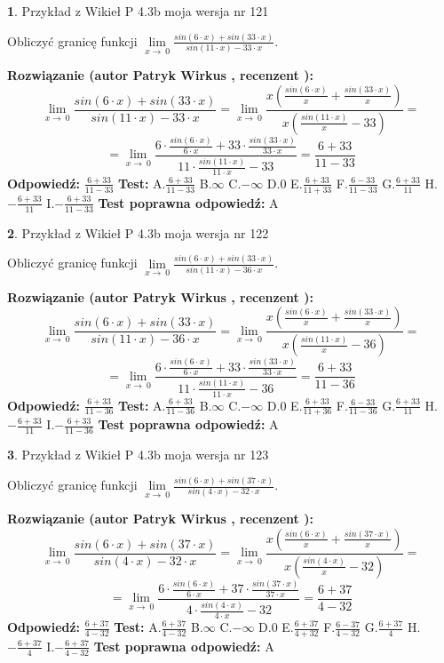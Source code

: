 \documentclass[12pt, a4paper]{article}
\theoremstyle{definition} %
\newtheorem{zad}{}
\newcommand{\zadStart}[1]{\begin{zad}#1\newline}
\newcommand{\zadStop}{\end{zad}}
\newcommand{\rozwStart}[2]{\noindent \textbf{Rozwiązanie (autor #1 , recenzent #2): }\newline}
\newcommand{\rozwStop}{\newline}
\newcommand{\odpStart}{\noindent \textbf{Odpowiedź:}\newline}
\newcommand{\odpStop}{\newline}
\newcommand{\testStart}{\noindent \textbf{Test:}\newline}
\newcommand{\testStop}{\newline}
\newcommand{\kluczStart}{\noindent \textbf{Test poprawna odpowiedź:}\newline}
\newcommand{\kluczStop}{\newline}
\begin{document}
\zadStart{Przykład z Wikieł P 4.3b moja wersja nr 121}


Obliczyć granicę funkcji $\lim\limits_{x\to\ 0}\frac{sin(6 \cdot x)+sin(33 \cdot x)}{sin(11 \cdot x)-33 \cdot x}$.
\zadStop
\rozwStart{Patryk Wirkus}{}
$$\lim\limits_{x\to\ 0}\frac{sin(6 \cdot x)+sin(33 \cdot x)}{sin(11 \cdot x)-33 \cdot x}=\lim\limits_{x\to\ 0}\frac{x(\frac{sin(6 \cdot x)}{x}+\frac{sin(33 \cdot x)}{x})}{x(\frac{sin(11 \cdot x)}{x}-33)}=$$
$$=\lim\limits_{x\to\ 0}\frac{6 \cdot \frac{sin(6 \cdot x)}{6 \cdot x}+33 \cdot \frac{sin(33 \cdot x)}{33 \cdot x}}{11 \cdot \frac{sin(11 \cdot x)}{11 \cdot x}-33}=\frac{6+33}{11-33}$$
\rozwStop
\odpStart
$\frac{6+33}{11-33}$
\odpStop
\testStart
A.$\frac{6+33}{11-33}$
B.$\infty$
C.$-\infty$
D.$0$
E.$\frac{6+33}{11+33}$
F.$\frac{6-33}{11-33}$
G.$\frac{6+33}{11}$
H.$-\frac{6+33}{11}$
I.$-\frac{6+33}{11-33}$
\testStop
\kluczStart
A
\kluczStop



\zadStart{Przykład z Wikieł P 4.3b moja wersja nr 122}


Obliczyć granicę funkcji $\lim\limits_{x\to\ 0}\frac{sin(6 \cdot x)+sin(33 \cdot x)}{sin(11 \cdot x)-36 \cdot x}$.
\zadStop
\rozwStart{Patryk Wirkus}{}
$$\lim\limits_{x\to\ 0}\frac{sin(6 \cdot x)+sin(33 \cdot x)}{sin(11 \cdot x)-36 \cdot x}=\lim\limits_{x\to\ 0}\frac{x(\frac{sin(6 \cdot x)}{x}+\frac{sin(33 \cdot x)}{x})}{x(\frac{sin(11 \cdot x)}{x}-36)}=$$
$$=\lim\limits_{x\to\ 0}\frac{6 \cdot \frac{sin(6 \cdot x)}{6 \cdot x}+33 \cdot \frac{sin(33 \cdot x)}{33 \cdot x}}{11 \cdot \frac{sin(11 \cdot x)}{11 \cdot x}-36}=\frac{6+33}{11-36}$$
\rozwStop
\odpStart
$\frac{6+33}{11-36}$
\odpStop
\testStart
A.$\frac{6+33}{11-36}$
B.$\infty$
C.$-\infty$
D.$0$
E.$\frac{6+33}{11+36}$
F.$\frac{6-33}{11-36}$
G.$\frac{6+33}{11}$
H.$-\frac{6+33}{11}$
I.$-\frac{6+33}{11-36}$
\testStop
\kluczStart
A
\kluczStop



\zadStart{Przykład z Wikieł P 4.3b moja wersja nr 123}


Obliczyć granicę funkcji $\lim\limits_{x\to\ 0}\frac{sin(6 \cdot x)+sin(37 \cdot x)}{sin(4 \cdot x)-32 \cdot x}$.
\zadStop
\rozwStart{Patryk Wirkus}{}
$$\lim\limits_{x\to\ 0}\frac{sin(6 \cdot x)+sin(37 \cdot x)}{sin(4 \cdot x)-32 \cdot x}=\lim\limits_{x\to\ 0}\frac{x(\frac{sin(6 \cdot x)}{x}+\frac{sin(37 \cdot x)}{x})}{x(\frac{sin(4 \cdot x)}{x}-32)}=$$
$$=\lim\limits_{x\to\ 0}\frac{6 \cdot \frac{sin(6 \cdot x)}{6 \cdot x}+37 \cdot \frac{sin(37 \cdot x)}{37 \cdot x}}{4 \cdot \frac{sin(4 \cdot x)}{4 \cdot x}-32}=\frac{6+37}{4-32}$$
\rozwStop
\odpStart
$\frac{6+37}{4-32}$
\odpStop
\testStart
A.$\frac{6+37}{4-32}$
B.$\infty$
C.$-\infty$
D.$0$
E.$\frac{6+37}{4+32}$
F.$\frac{6-37}{4-32}$
G.$\frac{6+37}{4}$
H.$-\frac{6+37}{4}$
I.$-\frac{6+37}{4-32}$
\testStop
\kluczStart
A
\kluczStop
\end{document}
